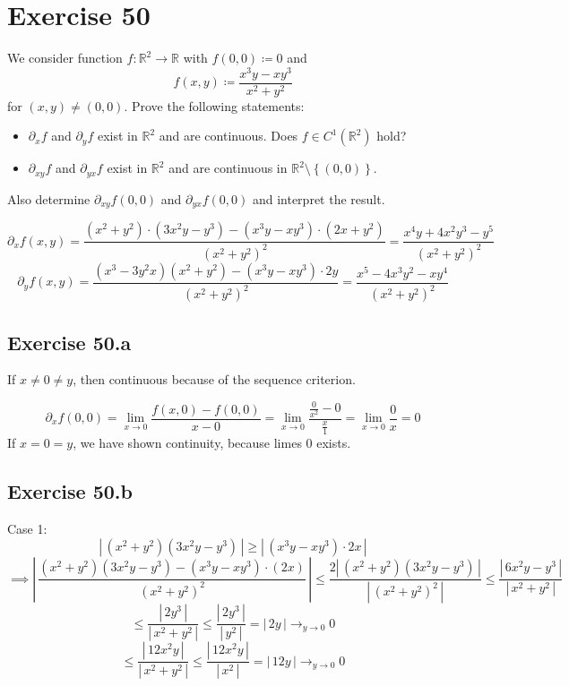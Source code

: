 \documentclass[a4paper]{article}
\theoremstyle{definition}
\newcommand\abs[1]{\left|\,#1\,\right|}
\newcommand\set[1]{\left\{#1\right\}}
\begin{document}
\section{Exercise 50}
\begin{ex}
  We consider function $f: \mathbb R^2 \to \mathbb R$ with $f(0, 0) \coloneqq 0$ and
  \[ f(x, y) \coloneqq \frac{x^3y - xy^3}{x^2 + y^2} \]
  for $(x,y) \neq (0, 0)$. Prove the following statements:
  \begin{itemize}
  \item $\partial_x f$ and $\partial_y f$ exist in $\mathbb R^2$ and are continuous. Does $f \in C^1(\mathbb R^2)$ hold?
  \item $\partial_{xy} f$ and $\partial_{yx} f$ exist in $\mathbb R^2$ and are continuous in $\mathbb R^2 \setminus \set{(0,0)}$.
  \end{itemize}
  Also determine $\partial_{xy} f(0,0)$ and $\partial_{yx} f(0,0)$ and interpret the result.
\end{ex}

\[ \partial_x f(x,y) = \frac{(x^2 + y^2) \cdot (3x^2 y - y^3) - (x^3 y - xy^3) \cdot (2x + y^2)}{(x^2 + y^2)^2} = \frac{x^4y + 4x^2 y^3 - y^5}{(x^2 + y^2)^2} \]
\[ \partial_y f(x,y) = \frac{(x^3 - 3y^2 x) (x^2 + y^2) - (x^3 y - xy^3) \cdot 2y}{(x^2 + y^2)^2} = \frac{x^5 - 4x^3 y^2 - xy^4}{(x^2 + y^2)^2} \]

\subsection{Exercise 50.a}
If $x \neq 0 \neq y$, then continuous because of the sequence criterion.

\[ \partial_x f(0,0) = \lim_{x\to 0} \frac{f(x,0) - f(0,0)}{x - 0} = \lim_{x\to 0} \frac{\frac{0}{x^2} - 0}{\frac{x}{1}} = \lim_{x \to 0} \frac{0}{x} = 0 \]
If $x = 0 = y$, we have shown continuity, because limes $0$ exists.

\subsection{Exercise 50.b}
Case 1:
\[ \abs{(x^2 + y^2) (3x^2 y - y^3)} \geq \abs{(x^3 y - xy^3) \cdot 2x} \]
\[ \implies \abs{\frac{(x^2 + y^2)(3x^2 y - y^3) - (x^3 y - xy^3) \cdot (2x)}{(x^2 + y^2)^2}} \leq \frac{2\abs{(x^2 + y^2) (3x^2 y - y^3)}}{\abs{(x^2 + y^2)^2}}
  \leq \frac{\abs{6x^2 y - y^3}}{\abs{x^2 + y^2}} \]
\[ \leq \frac{\abs{2y^3    }}{\abs{x^2 + y^2}} \leq \frac{\abs{2y^3  }}{\abs{y^2}} = \abs{2y } \to_{y \to 0} 0 \]
\[ \leq \frac{\abs{12 x^2 y}}{\abs{x^2 + y^2}} \leq \frac{\abs{12x^2y}}{\abs{x^2}} = \abs{12y} \to_{y \to 0} 0 \]
  
\end{document}
